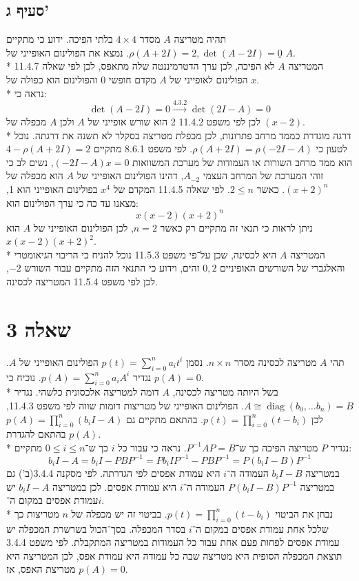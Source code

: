 \documentclass[a4paper,10pt]{article}
\DeclareMathOperator\diag{diag}
\begin{document}
\subsection{סעיף ג'}
תהיה מטריצה $A$ מסדר $4 \times 4$ בלתי הפיכה.
ידוע כי מתקיים $\rho(A + 2I) = 2, \det(A - 2I) = \underline{0}$.
נמצא את הפולינום האופייני של $A$. \\*
המטריצה $A$ לא הפיכה, לכן ערך הדטרמיננטה שלה מתאפס, 
לכן לפי שאלה 11.4.7 הפולינום לאופייני של $A$ מקדם חופשי $0$ והפולינום הוא כפולה של $x$. \\*
נראה כי:
\[
	\det(A - 2I) = 0 \xrightarrow{4.3.2} \det(2I - A) = 0
\]
לכן לפי משפט 11.4.2 2 הוא שורש אופייני של $A$
ולכן $A$ מכפלה של $(x - 2)$. \\*
דרגה מוגדרת כממד מרחב פתרונות, לכן מכפלת מטריצה בסקלר לא תשנה את דרגתה.
נוכל לטעון כי $\rho(A + 2I) = \rho(-2I - A)$.
לפי משפט 8.6.1 מתקיים $4 - \rho(A + 2I) = 2$ הוא ממד מרחב השורות או העמודות של מערכת
המשוואות $(-2I - A)x = 0$, נשים לב כי זוהי המערכת של המרחב העצמי $A_{-2}$,
דהינו הפולינום האופייני של $A$ הוא מכפלה של ${(x + 2)}^n$.
כאשר $2 \le n$.
לפי שאלה 11.4.5 המקדם של $x^4$ בפולינום האופייני הוא 1,
מצאנו עד כה כי ערך הפולינום הוא:
\[
	x(x-2){(x+2)}^n
\]
ניתן לראות כי תנאי זה מתקיים רק כאשר $n = 2$,
לכן הפולינום האופייני של $A$ הוא $x(x - 2){(x + 2)}^2$. \\*
המטריצה $A$ היא לכסינה, שכן על־פי משפט 11.5.3 נוכל להניח כי
הריבוי הגיאומטרי והאלגברי של השורשים האופיניים $0, 2$ זהים,
וידוע כי התנאי הזה מתקיים עבור השורש $-2$,
לכן לפי משפט 11.5.4 המטריצה לכסינה.

\section{שאלה 3}
תהי $A$ מטריצה לכסינה מסדר $n \times n$.
נסמן $p(t) = \sum_{i = 0}^{n} a_i t^i$ הפולינום האופייני של $A$.
נגדיר $p(A) = \sum_{i = 0}^{n} a_i A^i$.
נוכיח כי $p(A) = 0$. \\*
בשל היותה מטריצה לכסינה, $A$ דומה למטריצה אלכסונית כלשהי.
נגדיר $A \cong \diag(b_0, \hdots b_n) = B$.
הפולינום האופייני של מטריצות דומות שווה לפי משפט 11.4.3,
לכן $p(t) = \prod_{i = 0}^{n} (t - b_i)$.
בהתאם מתקיים גם $p(A) = \prod_{i = 0}^n (b_i I - A)$ בהתאם להגדרת $p(A)$. \\*
נגדיר $P$ מטריצה הפיכה כך ש־$P^{-1} A P = B$.
נראה כי עבור כל $i$ כך ש־$0 \le i \le n$ מתקיים:
\[
	b_i I - A
	= b_i I - P B P^{-1}
	= P b_i I P^{-1} - P B P^{-1}
	= P (b_i I - B) P^{-1}
\]
במטריצה $b_i I - B$ העמודה ה־$i$ היא עמודת אפסים לפי הגדרתה.
לפי מסקנה 3.4.4(ב') גם במטריצה $P (b_i I - B) P^{-1}$
העמודה ה־$i$ היא עמודת אפסים.
לכן במטריצה $b_i I - A$ יש עמודת אפסים במקום ה־$i$. \\*
נבחן את הביטוי $p(t) = \prod_{i = 0}^{n} (t - b_i)$.
בביטוי זה יש מכפלה של $n$ מטריצות כך שלכל אחת עמודת אפסים במקום ה־$i$
בסדר המכפלה. בסך־הכול בשרשרת המכפלה יש עמודת אפסים לפחות פעם אחת עבור
כל העמודות במטריצה המתקבלת. לפי משפט 3.4.4 תוצאת המכפלה הסופית היא
מטריצה שבה כל עמודה היא עמודת אפס, לכן המטריצה היא מטריצת האפס,
אז $p(A) = 0$.
\end{document}
